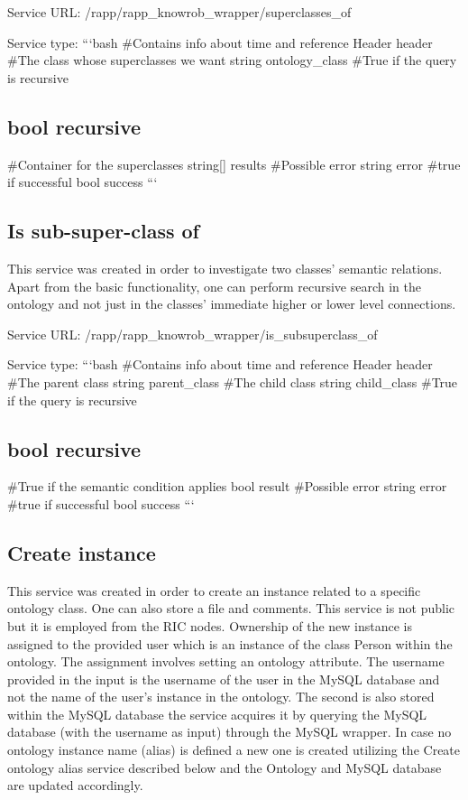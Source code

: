 Service U\-R\-L\-: {\ttfamily /rapp/rapp\-\_\-knowrob\-\_\-wrapper/superclasses\-\_\-of}

Service type\-: ```bash \#\-Contains info about time and reference Header header \#\-The class whose superclasses we want string ontology\-\_\-class \#\-True if the query is recursive \subsection*{bool recursive }

\#\-Container for the superclasses string\mbox{[}\mbox{]} results \#\-Possible error string error \#true if successful bool success ```

\subsection*{Is sub-\/super-\/class of}

This service was created in order to investigate two classes’ semantic relations. Apart from the basic functionality, one can perform recursive search in the ontology and not just in the classes’ immediate higher or lower level connections.

Service U\-R\-L\-: {\ttfamily /rapp/rapp\-\_\-knowrob\-\_\-wrapper/is\-\_\-subsuperclass\-\_\-of}

Service type\-: ```bash \#\-Contains info about time and reference Header header \#\-The parent class string parent\-\_\-class \#\-The child class string child\-\_\-class \#\-True if the query is recursive \subsection*{bool recursive }

\#\-True if the semantic condition applies bool result \#\-Possible error string error \#true if successful bool success ```

\subsection*{Create instance}

This service was created in order to create an instance related to a specific ontology class. One can also store a file and comments. This service is not public but it is employed from the R\-I\-C nodes. Ownership of the new instance is assigned to the provided user which is an instance of the class Person within the ontology. The assignment involves setting an ontology attribute. The username provided in the input is the username of the user in the My\-S\-Q\-L database and not the name of the user’s instance in the ontology. The second is also stored within the My\-S\-Q\-L database the service acquires it by querying the My\-S\-Q\-L database (with the username as input) through the My\-S\-Q\-L wrapper. In case no ontology instance name (alias) is defined a new one is created utilizing the Create ontology alias service described below and the Ontology and My\-S\-Q\-L database are updated accordingly.

